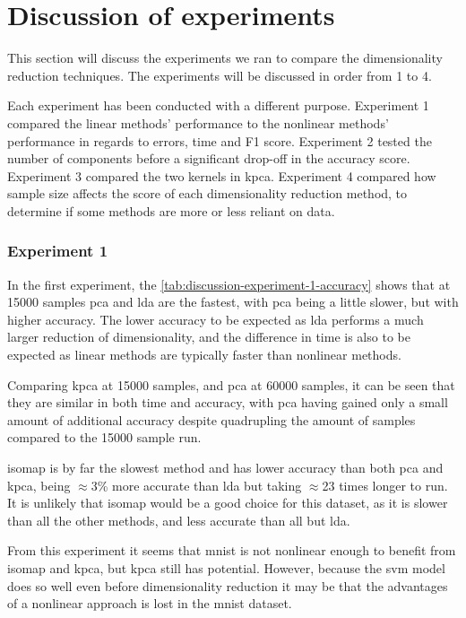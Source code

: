 \section{Discussion of experiments} \label{sec:experiments}
This section will discuss the experiments we ran to compare the dimensionality reduction techniques. The experiments will be discussed in order from 1 to 4.

Each experiment has been conducted with a different purpose. Experiment 1 compared the linear methods' performance to the nonlinear methods' performance in regards to errors, time and F1 score. Experiment 2 tested the number of components before a significant drop-off in the accuracy score. Experiment 3 compared the two kernels in \gls{kpca}. Experiment 4 compared how sample size affects the score of each dimensionality reduction method, to determine if some methods are more or less reliant on data.


\subsubsection{Experiment 1}\label{subsec:experiment-1}
In the first experiment, the \autoref{tab:discussion-experiment-1-accuracy} shows that at 15000 samples \gls{pca} and \gls{lda} are the fastest, with \gls{pca} being a little slower, but with higher accuracy. The lower accuracy to be expected as \gls{lda} performs a much larger reduction of dimensionality, and the difference in time is also to be expected as linear methods are typically faster than nonlinear methods.

Comparing \gls{kpca} at 15000 samples, and \gls{pca} at 60000 samples, it can be seen that they are similar in both time and accuracy, with \gls{pca} having gained only a small amount of additional accuracy despite quadrupling the amount of samples compared to the 15000 sample run.

\gls{isomap} is by far the slowest method and has lower accuracy than both \gls{pca} and \gls{kpca}, being $\approx$3\% more accurate than \gls{lda} but taking $\approx$23 times longer to run. It is unlikely that \gls{isomap} would be a good choice for this dataset, as it is slower than all the other methods, and less accurate than all but \gls{lda}.

From this experiment it seems that \gls{mnist} is not nonlinear enough to benefit from \gls{isomap} and \gls{kpca}, but \gls{kpca} still has potential. However, because the \gls{svm} model does so well even before dimensionality reduction it may be that the advantages of a nonlinear approach is lost in the \gls{mnist} dataset.

